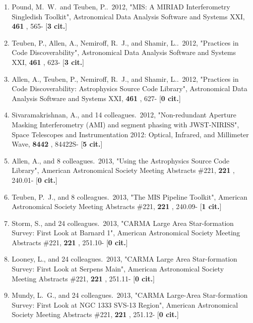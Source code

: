 \documentclass[11pt,letterpaper]{article}
\begin{document}
\begin{enumerate}[resume,label=\textbf{\arabic*}.]
\item  
Pound, M.~W.~and Teuben, P..\  2012,  "MIS: A MIRIAD Interferometry 
Singledish Toolkit", Astronomical Data Analysis Software and Systems XXI,  
{\bf 461} , 565- [{\bf 3 cit.}] 

\item  
Teuben, P., Allen, A., Nemiroff, R.~J., and Shamir, L..\  2012,  "Practices 
in Code Discoverability", Astronomical Data Analysis Software and Systems 
XXI,  {\bf 461} , 623- [{\bf 3 cit.}] 

\item  
Allen, A., Teuben, P., Nemiroff, R.~J., and Shamir, L..\  2012,  "Practices 
in Code Discoverability: Astrophysics Source Code Library", Astronomical 
Data Analysis Software and Systems XXI,  {\bf 461} , 627- [{\bf 0 cit.}] 

\item  
Sivaramakrishnan, A., and 14 colleagues.\  2012,  "Non-redundant Aperture 
Masking Interferometry (AMI) and segment phasing with JWST-NIRISS", Space 
Telescopes and Instrumentation 2012: Optical, Infrared, and Millimeter 
Wave,  {\bf 8442} , 84422S- [{\bf 5 cit.}] 

\item  
Allen, A., and 8 colleagues.\  2013,  "Using the Astrophysics Source Code 
Library", American Astronomical Society Meeting Abstracts \#221,  {\bf 221} 
, 240.01- [{\bf 0 cit.}] 

\item  
Teuben, P.~J., and 8 colleagues.\  2013,  "The MIS Pipeline Toolkit", 
American Astronomical Society Meeting Abstracts \#221,  {\bf 221} , 240.09- 
[{\bf 1 cit.}] 

\item  
Storm, S., and 24 colleagues.\  2013,  "CARMA Large Area Star-formation 
Survey: First Look at Barnard 1", American Astronomical Society Meeting 
Abstracts \#221,  {\bf 221} , 251.10- [{\bf 0 cit.}] 

\item  
Looney, L., and 24 colleagues.\  2013,  "CARMA Large Area Star-formation 
Survey: First Look at Serpens Main", American Astronomical Society Meeting 
Abstracts \#221,  {\bf 221} , 251.11- [{\bf 0 cit.}] 

\item  
Mundy, L.~G., and 24 colleagues.\  2013,  "CARMA Large-Area Star-formation 
Survey: First Look at NGC 1333 SVS-13 Region", American Astronomical 
Society Meeting Abstracts \#221,  {\bf 221} , 251.12- [{\bf 0 cit.}] 


\end{enumerate}
\end{document}
